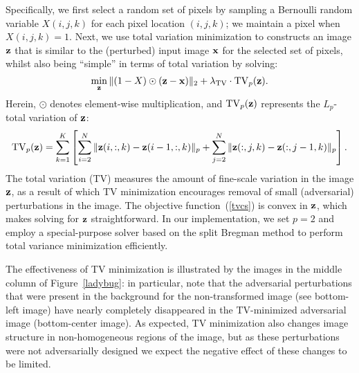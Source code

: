 
Specifically, we first select a random set of pixels by sampling a Bernoulli random variable $X(i, j, k)$ for each pixel location $(i, j, k)$; we maintain a pixel when $X(i, j, k) = 1$. Next, we use total variation minimization to constructs an image $\mathbf{z}$ that is similar to the (perturbed) input image $\mathbf{x}$ for the selected set of pixels, whilst also being ``simple'' in terms of total variation by solving:
\begin{equation}
\label{tvcs}
\min_{\mathbf{z}} \| (1-X) \odot (\mathbf{z} - \mathbf{x}) \|_2 + \lambda_{\operatorname{TV}} \cdot \operatorname{TV}_p(\mathbf{z}).
\end{equation}
Herein, $\odot$ denotes element-wise multiplication, and $\operatorname{TV}_p(\mathbf{z})$ represents the $L_p$-total variation of $\mathbf{z}$:
\begin{equation}
\label{lptv}
\operatorname{TV}_p(\mathbf{z}) = \sum_{k=1}^{K} \left[ \sum_{i=2}^{N} \|\mathbf{z}(i,:,k) - \mathbf{z}(i-1,:,k)\|_p + \sum_{j=2}^{N} \|\mathbf{z}(:,j,k) - \mathbf{z}(:,j-1,k)\|_p \right].
\end{equation}
The total variation (TV) measures the amount of fine-scale variation in the image $\mathbf{z}$, as a result of which TV minimization encourages removal of small (adversarial) perturbations in the image. The objective function~(\ref{tvcs}) is convex in $\mathbf{z}$, which makes solving for $\mathbf{z}$ straightforward. In our implementation, we set $p \!=\! 2$ and employ a special-purpose solver based on the split Bregman method
\citep{goldstein2009split} to perform total variance minimization efficiently.

The effectiveness of TV minimization is illustrated by the images in the middle column of Figure~\ref{ladybug}: in particular, note that the adversarial perturbations that were present in the background for the non-transformed image (see bottom-left image) have nearly completely disappeared in the TV-minimized adversarial image (bottom-center image). As expected, TV minimization also changes image structure in non-homogeneous regions of the image, but as these perturbations were not adversarially designed we expect the negative effect of these changes to be limited.

